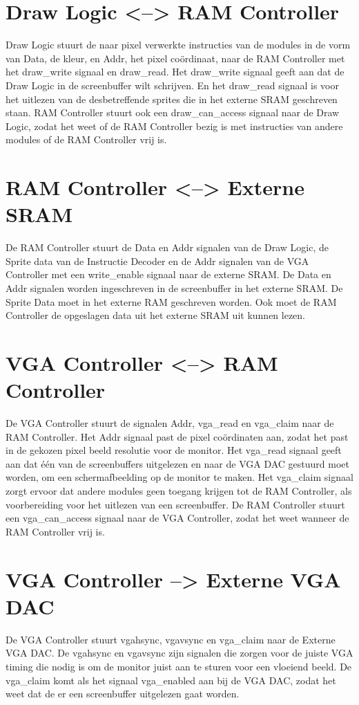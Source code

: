 \documentclass{scrartcl} %
\begin{document}
\section {Draw Logic <--> RAM Controller}
Draw Logic stuurt de naar pixel verwerkte instructies van de modules in de vorm van Data, de kleur, en Addr, het pixel coördinaat, naar de RAM Controller met het draw\_write signaal en draw\_read. Het draw\_write signaal geeft aan dat de Draw Logic in de screenbuffer wilt schrijven. En het draw\_read signaal is voor het uitlezen van de desbetreffende sprites die in het externe SRAM geschreven staan.
RAM Controller stuurt ook een draw\_can\_access signaal naar de Draw Logic, zodat het weet of de RAM Controller bezig is met instructies van andere modules of de RAM Controller vrij is.

\section{RAM Controller <--> Externe SRAM}
De RAM Controller stuurt de Data en Addr signalen van de Draw Logic, de Sprite data van de Instructie Decoder en de Addr signalen van de VGA Controller met een write\_enable signaal naar de externe SRAM. De Data en Addr signalen worden ingeschreven in de screenbuffer in het externe SRAM. De Sprite Data moet in het externe RAM geschreven worden.
Ook moet de RAM Controller de opgeslagen data uit het externe SRAM uit kunnen lezen.

\section{VGA Controller <--> RAM Controller}
De VGA Controller stuurt de signalen Addr, vga\_read en vga\_claim naar de RAM Controller. Het Addr signaal past de pixel coördinaten aan, zodat het past in de gekozen pixel beeld resolutie voor de monitor. Het vga\_read signaal geeft aan dat één van de screenbuffers uitgelezen en naar de VGA DAC gestuurd moet worden, om een schermafbeelding op de monitor te maken. Het vga\_claim signaal zorgt ervoor dat andere modules geen toegang krijgen tot de RAM Controller, als voorbereiding voor het uitlezen van een screenbuffer.
De RAM Controller stuurt een vga\_can\_access signaal naar de VGA Controller, zodat het weet wanneer de RAM Controller vrij is.

\section{VGA Controller --> Externe VGA DAC}
De VGA Controller stuurt vgahsync, vgavsync en vga\_claim naar de Externe VGA DAC. De vgahsync en vgavsync zijn signalen die zorgen voor de juiste VGA timing die nodig is om de monitor juist aan te sturen voor een vloeiend beeld. De vga\_claim komt als het signaal vga\_enabled aan bij de VGA DAC, zodat het weet dat de er een screenbuffer uitgelezen gaat worden.
\end{document}
